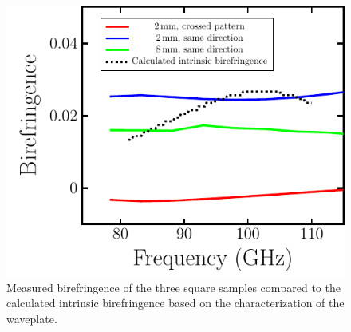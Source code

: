 \begin{figure}[H]
    \centering
    \includegraphics[scale=0.7]{images/results/plots/polymer/IntrinsicBF/FullPlatesWcalc_a.pdf}
    \caption{Measured birefringence of the three square samples compared to the calculated intrinsic birefringence based on the characterization of the waveplate. }
    \label{fig:FullPlatesWcalc}
\end{figure}

